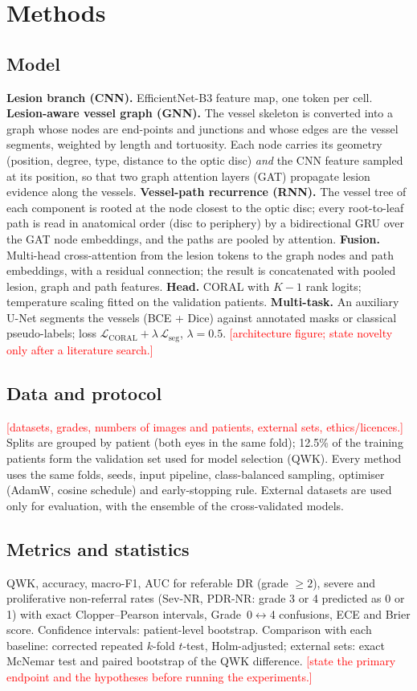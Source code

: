 \documentclass[11pt,a4paper]{article}
\newcommand{\todo}[1]{\textcolor{red}{[#1]}}
\begin{document}
\section{Methods}
\subsection{Model}
\textbf{Lesion branch (CNN).} EfficientNet-B3 feature map, one token per cell.
\textbf{Lesion-aware vessel graph (GNN).} The vessel skeleton is converted into a graph whose
nodes are end-points and junctions and whose edges are the vessel segments, weighted by
length and tortuosity. Each node carries its geometry (position, degree, type, distance to
the optic disc) \emph{and} the CNN feature sampled at its position, so that two graph
attention layers (GAT) propagate lesion evidence along the vessels.
\textbf{Vessel-path recurrence (RNN).} The vessel tree of each component is rooted at the
node closest to the optic disc; every root-to-leaf path is read in anatomical order
(disc to periphery) by a bidirectional GRU over the GAT node embeddings, and the paths are
pooled by attention.
\textbf{Fusion.} Multi-head cross-attention from the lesion tokens to the graph nodes and
path embeddings, with a residual connection; the result is concatenated with pooled lesion,
graph and path features. \textbf{Head.} CORAL with $K-1$ rank logits; temperature scaling
fitted on the validation patients. \textbf{Multi-task.} An auxiliary U-Net segments the
vessels (BCE + Dice) against annotated masks or classical pseudo-labels; loss
$\mathcal{L}_{\mathrm{CORAL}} + \lambda\,\mathcal{L}_{\mathrm{seg}}$, $\lambda = 0.5$.
\todo{architecture figure; state novelty only after a literature search.}

\subsection{Data and protocol}
\todo{datasets, grades, numbers of images and patients, external sets, ethics/licences.}
Splits are grouped by patient (both eyes in the same fold); 12.5\% of the training patients
form the validation set used for model selection (QWK). Every method uses the same folds,
seeds, input pipeline, class-balanced sampling, optimiser (AdamW, cosine schedule) and
early-stopping rule. External datasets are used only for evaluation, with the ensemble of
the cross-validated models.

\subsection{Metrics and statistics}
QWK, accuracy, macro-F1, AUC for referable DR (grade $\geq2$), severe and proliferative
non-referral rates (Sev-NR, PDR-NR: grade 3 or 4 predicted as 0 or 1) with exact
Clopper--Pearson intervals, Grade~0$\leftrightarrow$4 confusions, ECE and Brier score.
Confidence intervals: patient-level bootstrap. Comparison with each baseline: corrected
repeated $k$-fold $t$-test, Holm-adjusted; external sets: exact McNemar test and paired
bootstrap of the QWK difference. \todo{state the primary endpoint and the hypotheses
before running the experiments.}
\end{document}
